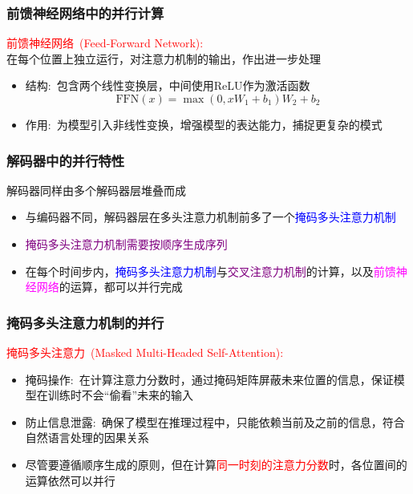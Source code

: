 \begin{frame}
    \frametitle{前馈神经网络中的并行计算}
\textcolor{red}{前馈神经网络~\textrm{(Feed-Forward Network):}}\\
    在每个位置上独立运行，对注意力机制的输出，作出进一步处理
    \begin{itemize}
		\setlength{\itemsep}{10pt}
	    \item 结构:~包含两个线性变换层，中间使用\textrm{ReLU}作为激活函数\\
		    \begin{displaymath}
			     \mathrm{FFN}(x) = \max(0, x W_1 + b_1) W_2 + b_2 
		    \end{displaymath}
		    {\fontsize{7.2pt}{6.2pt}\selectfont{其中$W_1$, $W_2$是权重矩阵，$b_1$, $b_2$是偏置向量}}
\vskip 2pt
{\fontsize{7.2pt}{6.2pt}}
        \item 作用:~为模型引入非线性变换，增强模型的表达能力，捕捉更复杂的模式
    \end{itemize}
\end{frame}

\begin{frame}
    \frametitle{解码器中的并行特性}
    解码器同样由多个解码器层堆叠而成
    \begin{itemize}
		\setlength{\itemsep}{10pt}
		\item 与编码器不同，解码器层在多头注意力机制前多了一个\textcolor{blue}{掩码多头注意力机制}
		\item \textcolor{purple}{掩码多头注意力机制需要按顺序生成序列}
		\item 在每个时间步内，\textcolor{blue}{掩码多头注意力机制}与\textcolor{purple}{交叉注意力机制}的计算，以及\textcolor{magenta}{前馈神经网络}的运算，都可以并行完成
    \end{itemize}
\end{frame}

\begin{frame}
    \frametitle{掩码多头注意力机制的并行}
\textcolor{red}{掩码多头注意力~\textrm{(Masked Multi-Headed Self-Attention):}}
    \begin{itemize}
		\setlength{\itemsep}{10pt}
        \item 掩码操作:~在计算注意力分数时，通过掩码矩阵屏蔽未来位置的信息，保证模型在训练时不会“偷看”未来的输入
		\vskip 1pt
		{\fontsize{7.2pt}{6.2pt}}
        \item 防止信息泄露:~确保了模型在推理过程中，只能依赖当前及之前的信息，符合自然语言处理的因果关系
	\item 尽管要遵循顺序生成的原则，但在计算\textcolor{red}{同一时刻的注意力分数}时，各位置间的运算依然可以并行
    \end{itemize}
\end{frame}

